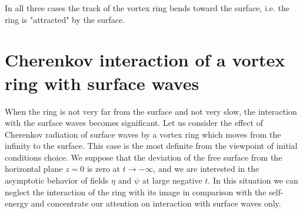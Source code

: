 In all three cases the track of the vortex ring bends toward the surface, 
i.e. the ring is "attracted" by the surface.

\section{Cherenkov interaction of a vortex ring with surface waves}

When the ring is not very far from the surface and not very slow, 
the interaction with the surface waves becomes significant. 
Let us consider the effect of Cherenkov radiation of surface waves 
by a vortex ring which moves from the infinity to the surface. 
This case is the most definite from the viewpoint of initial conditions choice.
We suppose that the deviation of the free surface from the horizontal plane 
$z=0$ is zero at $t\to-\infty$, and we are interested in the asymptotic 
behavior of fields $\eta$ and $\psi$ at large negative $t$. 
In this situation we can neglect the interaction of the ring with its 
image in comparison with the self-energy 
and concentrate our attention on interaction with surface waves only.



